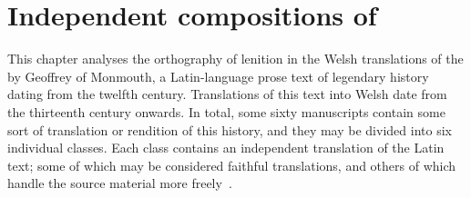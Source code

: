 \chapter{Independent compositions of }
\label{cha:indep-comp-mwbr}
This chapter analyses the orthography of lenition in the Welsh translations of the   by Geoffrey of Monmouth, a Latin-language  prose text of legendary history dating from the twelfth century.
Translations of this text into Welsh date from the thirteenth century onwards.
In total, some sixty manuscripts contain some sort of translation or rendition of this history, and they may be divided into six individual classes.
Each  class contains an independent translation of the Latin text; some of which may be considered faithful translations, and others of which handle the source material more freely~\autocite[xxiv-xxxi]{roberts_brut_1971}.

